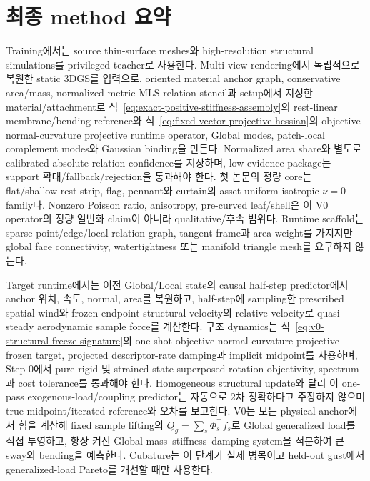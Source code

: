 \documentclass[11pt,a4paper]{article}
\begin{document}
\section{최종 method 요약}

Training에서는 source thin-surface meshes와 high-resolution structural simulations를
privileged teacher로 사용한다.
Multi-view rendering에서 독립적으로 복원한 static 3DGS를 입력으로,
oriented material anchor graph, conservative area/mass,
normalized metric-MLS relation stencil과 setup에서 지정한 material/attachment로
식~\eqref{eq:exact-positive-stiffness-assembly}의 rest-linear membrane/bending reference와
식~\eqref{eq:fixed-vector-projective-hessian}의 objective normal-curvature projective runtime operator,
Global modes, patch-local complement modes와 Gaussian binding을 만든다.
Normalized area share와 별도로 calibrated absolute relation confidence를 저장하며,
low-evidence package는 support 확대/fallback/rejection을 통과해야 한다.
첫 논문의 정량 core는 flat/shallow-rest strip, flag, pennant와 curtain의
asset-uniform isotropic \(\nu=0\) family다. Nonzero Poisson ratio, anisotropy,
pre-curved leaf/shell은 이 V0 operator의 정량 일반화 claim이 아니라 qualitative/후속 범위다.
Runtime scaffold는 sparse point/edge/local-relation graph, tangent frame과 area weight를 가지지만
global face connectivity, watertightness 또는 manifold triangle mesh를 요구하지 않는다.

Target runtime에서는 이전 Global/Local state의 causal half-step predictor에서 anchor 위치, 속도,
normal, area를 복원하고, half-step에 sampling한 prescribed spatial wind와
frozen endpoint structural velocity의 relative velocity로
quasi-steady aerodynamic sample force를 계산한다.
구조 dynamics는 식~\eqref{eq:v0-structural-freeze-signature}의
one-shot objective normal-curvature projective frozen target, projected descriptor-rate damping과
implicit midpoint를 사용하며, Step 0에서 pure-rigid 및 strained-state superposed-rotation
objectivity, spectrum과 cost tolerance를 통과해야 한다.
Homogeneous structural update와 달리 이 one-pass exogenous-load/coupling predictor는
자동으로 2차 정확하다고 주장하지 않으며 true-midpoint/iterated reference와 오차를 보고한다.
V0는 모든 physical anchor에서 힘을 계산해 fixed sample lifting의
\(Q_g=\sum_s\Phi_s^\top f_s\)로 Global generalized load를 직접 투영하고,
항상 켜진 Global mass--stiffness--damping system을 적분하여 큰 sway와 bending을 예측한다.
Cubature는 이 단계가 실제 병목이고 held-out gust에서 generalized-load Pareto를 개선할 때만 사용한다.
\end{document}
